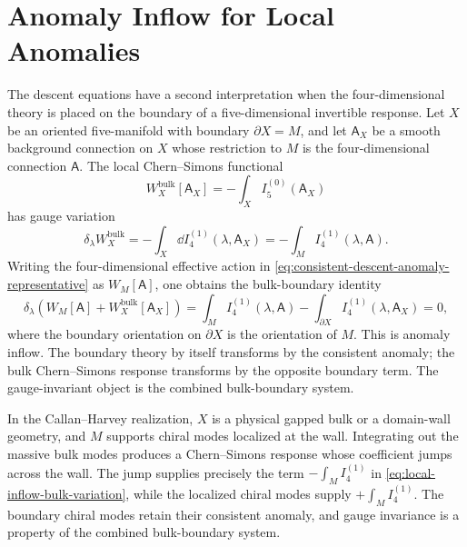 \section{Anomaly Inflow for Local Anomalies}

The descent equations have a second interpretation when the four-dimensional
theory is placed on the boundary of a five-dimensional invertible response.
Let \(X\) be an oriented five-manifold with boundary
\(\partial X=M\), and let \(\mathsf A_X\) be a smooth background connection on
\(X\) whose restriction to \(M\) is the four-dimensional connection
\(\mathsf A\).  The local Chern--Simons functional
\begin{equation}
  W_X^{\mathrm{bulk}}[\mathsf A_X]
  =
  -\int_X I_5^{(0)}(\mathsf A_X)
  \label{eq:local-inflow-bulk-functional}
\end{equation}
has gauge variation
\begin{equation}
  \delta_\lambda W_X^{\mathrm{bulk}}
  =
  -\int_X \dd I_4^{(1)}(\lambda,\mathsf A_X)
  =
  -\int_M I_4^{(1)}(\lambda,\mathsf A).
  \label{eq:local-inflow-bulk-variation}
\end{equation}
Writing the four-dimensional effective action in
\eqref{eq:consistent-descent-anomaly-representative} as \(W_M[\mathsf A]\),
one obtains the bulk-boundary identity
\begin{equation}
  \delta_\lambda
  \left(
    W_M[\mathsf A]+W_X^{\mathrm{bulk}}[\mathsf A_X]
  \right)
  =
  \int_M I_4^{(1)}(\lambda,\mathsf A)
  -
  \int_{\partial X} I_4^{(1)}(\lambda,\mathsf A_X)
  =
  0,
  \label{eq:local-anomaly-inflow-cancellation}
\end{equation}
where the boundary orientation on \(\partial X\) is the orientation of \(M\).
This is anomaly inflow.  The boundary theory by itself transforms by the
consistent anomaly; the bulk Chern--Simons response transforms by the opposite
boundary term.  The gauge-invariant object is the combined bulk-boundary
system.

In the Callan--Harvey realization, \(X\) is a physical gapped bulk or a
domain-wall geometry, and \(M\) supports chiral modes localized at the wall.
Integrating out the massive bulk modes produces a Chern--Simons response whose
coefficient jumps across the wall.  The jump supplies precisely the term
\(-\int_M I_4^{(1)}\) in \eqref{eq:local-inflow-bulk-variation}, while the
localized chiral modes supply \(+\int_M I_4^{(1)}\).  The boundary chiral
modes retain their consistent anomaly, and gauge invariance is a property of
the combined bulk-boundary system.

